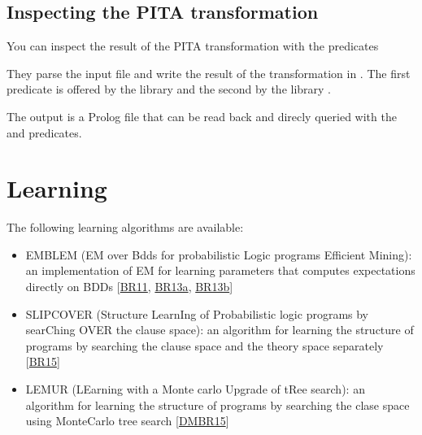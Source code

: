 \documentclass[letterpaper,10pt,english]{sphinxmanual}
\begin{document}
\section{Inspecting the PITA transformation}
\label{\detokenize{index:inspecting-the-pita-transformation}}
\sphinxAtStartPar
You can inspect the result of the PITA transformation with the predicates

\begin{sphinxVerbatim}[commandchars=\\\{\}]
\end{sphinxVerbatim}

\sphinxAtStartPar
They parse the input file  and write the result of the transformation in .
The first predicate is offered by the library  and the second by the library .

\sphinxAtStartPar
The output is a Prolog file that can be read back and direcly queried with the  and
 predicates.


\chapter{Learning}
\label{\detokenize{index:learning}}
\sphinxAtStartPar
The following learning algorithms are available:
\begin{itemize}
\item {} 
\sphinxAtStartPar
EMBLEM (EM over Bdds for probabilistic Logic programs Efficient Mining): an implementation of EM for learning parameters that computes expectations directly on BDDs {[}\hyperlink{cite.index:id64}{BR11}, \hyperlink{cite.index:id69}{BR13a}, \hyperlink{cite.index:id63}{BR13b}{]}

\item {} 
\sphinxAtStartPar
SLIPCOVER (Structure LearnIng of Probabilistic logic programs by searChing OVER the clause space): an algorithm for learning the structure of programs by searching the clause space and the theory space separately {[}\hyperlink{cite.index:id65}{BR15}{]}

\item {} 
\sphinxAtStartPar
LEMUR (LEarning with a Monte carlo Upgrade of tRee search): an algorithm for learning the structure of programs by searching the clase space using Monte\sphinxhyphen{}Carlo tree search {[}\hyperlink{cite.index:id66}{DMBR15}{]}

\end{itemize}
\end{document}
